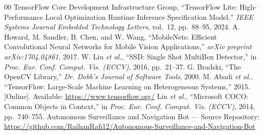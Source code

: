 \documentclass[conference]{IEEEtran}
\begin{document}
\begin{thebibliography}{00}
 TensorFlow Core Development Infrastructure Group, ``TensorFlow Lite: High-Performance Local Optimization Runtime Inference Specification Model,'' \textit{IEEE Systems Journal Embedded Technology Letters}, vol.~12, pp.~88--95, 2024.
 A. Howard, M. Sandler, B. Chen, and W. Wang, ``MobileNets: Efficient Convolutional Neural Networks for Mobile Vision Applications,'' \textit{arXiv preprint arXiv:1704.04861}, 2017.
 W. Liu \textit{et al.}, ``SSD: Single Shot MultiBox Detector,'' in \textit{Proc. Eur. Conf. Comput. Vis. (ECCV)}, 2016, pp.~21--37.
 G. Bradski, ``The OpenCV Library,'' \textit{Dr. Dobb's Journal of Software Tools}, 2000.
 M. Abadi \textit{et al.}, ``TensorFlow: Large-Scale Machine Learning on Heterogeneous Systems,'' 2015. [Online]. Available: \url{https://www.tensorflow.org/}
 Lin \textit{et al.}, ``Microsoft COCO: Common Objects in Context,'' in \textit{Proc. Eur. Conf. Comput. Vis. (ECCV)}, 2014, pp.~740--755.
 Autonomous Surveillance and Navigation Bot --- Source Repository: \url{https://github.com/RaihanRafi12/Autonomous-Surveillance-and-Navigation-Bot}
\end{thebibliography}
\end{document}
